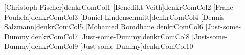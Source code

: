 %
[Christoph Fischer]{denkrComCol1}%
%
[Benedikt Veith]{denkrComCol2}%
%
[Franc Pouhela]{denkrComCol3}%
%
[Daniel Lindenschmitt]{denkrComCol4}%
%
[Dennis Salzmann]{denkrComCol5}%
%
[Mohamed Romdhane]{denkrComCol6}%
%
[Just-some-Dummy]{denkrComCol7}%
%
[Just-some-Dummy]{denkrComCol8}%
%
[Just-some-Dummy]{denkrComCol9}%
%
[Just-some-Dummy]{denkrComCol10}%
%
